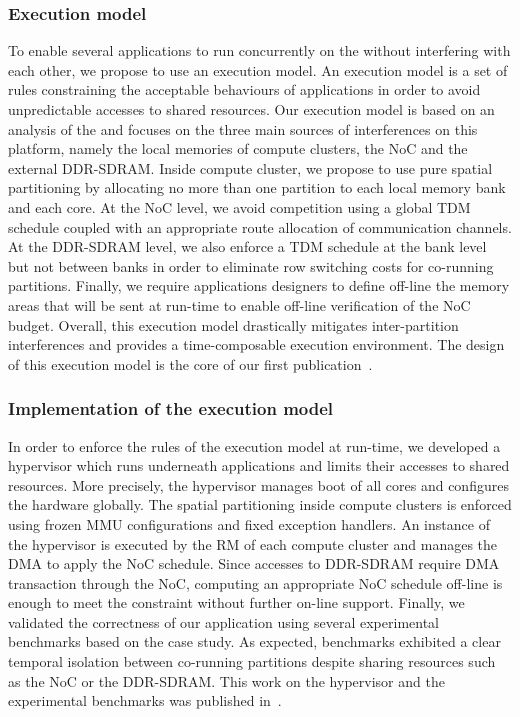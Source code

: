 \documentclass[main.tex]{subfiles}
\begin{document}
\subsubsection{Execution model}
To enable several applications to run concurrently on the \mppalong without interfering with each other, we propose to use an execution model. An execution model is a set of rules constraining the acceptable behaviours of applications in order to avoid unpredictable accesses to shared resources. Our execution model is based on an analysis of the \mppalong and focuses on the three main sources of interferences on this platform, namely the local memories of compute clusters, the NoC and the external DDR-SDRAM. Inside compute cluster, we propose to use pure spatial partitioning by allocating no more than one partition to each local memory bank and each core. At the NoC level, we avoid competition using a global TDM schedule coupled with an appropriate route allocation of communication channels. At the DDR-SDRAM level, we also enforce a TDM schedule at the bank level but not between banks in order to eliminate row switching costs for co-running partitions. Finally, we require applications designers to define off-line the memory areas that will be sent at run-time to enable off-line verification of the NoC budget. Overall, this execution model drastically mitigates inter-partition interferences and provides a time-composable execution environment. The design of this execution model is the core of our first publication~\cite{Perret16}.

\subsubsection{Implementation of the execution model}
In order to enforce the rules of the execution model at run-time, we developed a hypervisor which runs underneath applications and limits their accesses to shared resources. More precisely, the hypervisor manages boot of all cores and configures the hardware globally. The spatial partitioning inside compute clusters is enforced using frozen MMU configurations and fixed exception handlers. An instance of the hypervisor is executed by the RM of each compute cluster and manages the DMA to apply the NoC schedule. Since accesses to DDR-SDRAM require DMA transaction through the NoC, computing an appropriate NoC schedule off-line is enough to meet the constraint without further on-line support. Finally, we validated the correctness of our application using several experimental benchmarks based on the \rosace case study. As expected, benchmarks exhibited a clear temporal isolation between co-running partitions despite sharing resources such as the NoC or the DDR-SDRAM. This work on the hypervisor and the experimental benchmarks was published in~\cite{Perret16_RTAS}.
\end{document}
